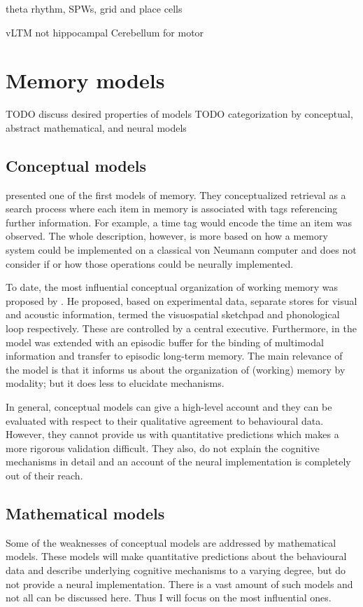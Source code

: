 theta rhythm, SPWs, grid and place cells

vLTM not hippocampal
Cerebellum for motor


\section{Memory models}
TODO discuss desired properties of models
TODO categorization by conceptual, abstract mathematical, and neural models

\subsection{Conceptual models}
\Textcite{Yntema1963} presented one of the first models of memory.
They conceptualized retrieval as a search process where each item in memory is associated with tags referencing further information.
For example, a time tag would encode the time an item was observed.
The whole description, however, is more based on how a memory system could be implemented on a classical von Neumann computer and does not consider if or how those operations could be neurally implemented.

To date, the most influential conceptual organization of working memory was proposed by \textcite{Baddeley1986}.
He proposed, based on experimental data, separate stores for visual and acoustic information, termed the visuospatial sketchpad and phonological loop respectively.
These are controlled by a central executive.
Furthermore, in \textcite{Baddeley2000} the model was extended with an episodic buffer for the binding of multimodal information and transfer to episodic long-term memory.
The main relevance of the model is that it informs us about the organization of (working) memory by modality; but it does less to elucidate mechanisms.

In general, conceptual models can give a high-level account and they can be evaluated with respect to their qualitative agreement to behavioural data.
However, they cannot provide us with quantitative predictions which makes a more rigorous validation difficult.
They also, do not explain the cognitive mechanisms in detail and an account of the neural implementation is completely out of their reach.


\subsection{Mathematical models}
Some of the weaknesses of conceptual models are addressed by mathematical models.
These models will make quantitative predictions about the behavioural data and describe underlying cognitive mechanisms to a varying degree, but do not provide a neural implementation.
There is a vast amount of such models and not all can be discussed here.
Thus I will focus on the most influential ones.

